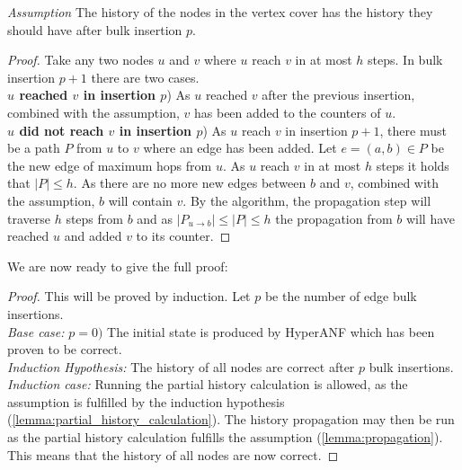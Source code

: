 \begin{theorem}
\begin{lemma}
\noindent\textit{Assumption } The history of the nodes in the vertex cover has the history they should have after bulk insertion $p$.

\begin{proof}

\noindent Take any two nodes $u$ and $v$ where $u$ reach $v$ in at most $h$ steps. In bulk insertion $p+1$ there are two cases. \\

\noindent\textbf{$u$ reached $v$ in insertion $p$}) As $u$ reached $v$ after the previous insertion, combined with the assumption, $v$ has been added to the counters of $u$. \\

\noindent\textbf{$u$ did not reach $v$ in insertion $p$}) As $u$ reach $v$ in insertion $p+1$, there must be a path $P$ from $u$ to $v$ where an edge has been added. Let $e = (a,b) \in P$ be the new edge of maximum hops from $u$. As $u$ reach $v$ in at most $h$ steps it holds that $|P| \leq h$.
As there are no more new edges between $b$ and $v$, combined with the assumption, $b$ will contain $v$. By the algorithm, the propagation step will traverse $h$ steps from $b$ and as 
$|P_{u \rightarrow b}| \leq |P| \leq h$ the propagation from $b$ will have reached $u$ and added $v$ to its counter. 

\end{proof}
\end{lemma}
\noindent We are now ready to give the full proof:

\begin{proof} This will be proved by induction. Let $p$ be the number of edge bulk insertions.\\

\noindent\textit{Base case:} $p = 0)$ The initial state is produced by HyperANF which has been proven to be correct.\\

\noindent\textit{Induction Hypothesis:} The history of all nodes are correct after $p$ bulk insertions.\\

\iffalse
Given that the history of all nodes are correct after insertion $p$, they will be correct after insertion $p+1$.\\
\fi

\noindent\textit{Induction case:}
Running the partial history calculation is allowed, as the assumption is fulfilled by the induction hypothesis (\ref{lemma:partial_history_calculation}). The history propagation may then be run as the partial history calculation fulfills the assumption (\ref{lemma:propagation}). This means that the history of all nodes are now correct. 

\end{proof}
\end{theorem}









